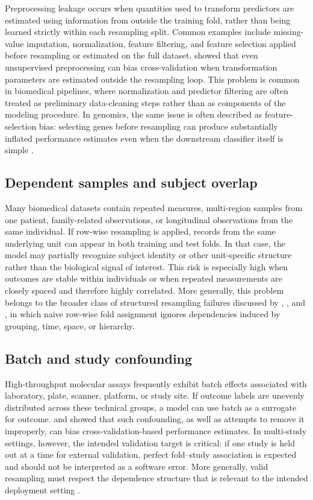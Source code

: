 \documentclass[article]{jss}
\begin{document}
Preprocessing leakage occurs when quantities used to transform predictors are estimated using information from outside the training fold, rather than being learned strictly within each resampling split. Common examples include missing-value imputation, normalization, feature filtering, and feature selection applied before resampling or estimated on the full dataset. \citet{moscovich2022} showed that even unsupervised preprocessing can bias cross-validation when transformation parameters are estimated outside the resampling loop. This problem is common in biomedical pipelines, where normalization and predictor filtering are often treated as preliminary data-cleaning steps rather than as components of the modeling procedure. In genomics, the same issue is often described as feature-selection bias: selecting genes before resampling can produce substantially inflated performance estimates even when the downstream classifier itself is simple \citep{ambroise2002, simon2003, subramanian2013}.

\subsection{Dependent samples and subject overlap}

Many biomedical datasets contain repeated measures, multi-region samples from one patient, family-related observations, or longitudinal observations from the same individual. If row-wise resampling is applied, records from the same underlying unit can appear in both training and test folds. In that case, the model may partially recognize subject identity or other unit-specific structure rather than the biological signal of interest. This risk is especially high when outcomes are stable within individuals or when repeated measurements are closely spaced and therefore highly correlated. More generally, this problem belongs to the broader class of structured resampling failures discussed by \citet{roberts2017}, \citet{wenger2012}, and \citet{valavi2019}, in which naive row-wise fold assignment ignores dependencies induced by grouping, time, space, or hierarchy.

\subsection{Batch and study confounding}

High-throughput molecular assays frequently exhibit batch effects associated with laboratory, plate, scanner, platform, or study site. If outcome labels are unevenly distributed across these technical groups, a model can use batch as a surrogate for outcome. \citet{soneson2014} and \citet{hamdan2023} showed that such confounding, as well as attempts to remove it improperly, can bias cross-validation-based performance estimates. In multi-study settings, however, the intended validation target is critical: if one study is held out at a time for external validation, perfect fold--study association is expected and should not be interpreted as a software error. More generally, valid resampling must respect the dependence structure that is relevant to the intended deployment setting \citep{roberts2017}.
\end{document}
